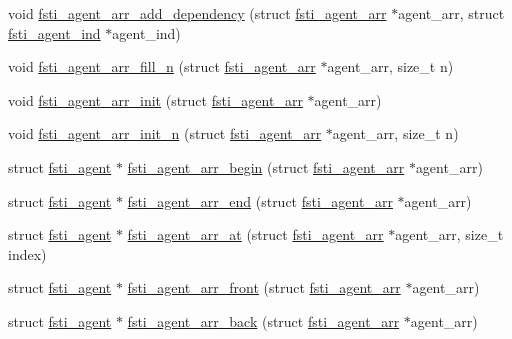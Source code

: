 \begin{DoxyCompactItemize}
void \mbox{\hyperlink{fsti-agent_8h_a63a22afc13737a55174adb97f2cbcfc1}{fsti\+\_\+agent\+\_\+arr\+\_\+add\+\_\+dependency}} (struct \mbox{\hyperlink{structfsti__agent__arr}{fsti\+\_\+agent\+\_\+arr}} $\ast$agent\+\_\+arr, struct \mbox{\hyperlink{structfsti__agent__ind}{fsti\+\_\+agent\+\_\+ind}} $\ast$agent\+\_\+ind)
\item 
void \mbox{\hyperlink{fsti-agent_8h_a87de33f5c064440c162d0c8d0f9ccbf8}{fsti\+\_\+agent\+\_\+arr\+\_\+fill\+\_\+n}} (struct \mbox{\hyperlink{structfsti__agent__arr}{fsti\+\_\+agent\+\_\+arr}} $\ast$agent\+\_\+arr, size\+\_\+t n)
\item 
void \mbox{\hyperlink{fsti-agent_8h_ab657b71989567b40adc4ccea49292540}{fsti\+\_\+agent\+\_\+arr\+\_\+init}} (struct \mbox{\hyperlink{structfsti__agent__arr}{fsti\+\_\+agent\+\_\+arr}} $\ast$agent\+\_\+arr)
\item 
void \mbox{\hyperlink{fsti-agent_8h_a2dc08a5f50e57b979f50f6efb927d57c}{fsti\+\_\+agent\+\_\+arr\+\_\+init\+\_\+n}} (struct \mbox{\hyperlink{structfsti__agent__arr}{fsti\+\_\+agent\+\_\+arr}} $\ast$agent\+\_\+arr, size\+\_\+t n)
\item 
struct \mbox{\hyperlink{structfsti__agent}{fsti\+\_\+agent}} $\ast$ \mbox{\hyperlink{fsti-agent_8h_a30c755dbd7cd8e98b76ebe65b8dc54a2}{fsti\+\_\+agent\+\_\+arr\+\_\+begin}} (struct \mbox{\hyperlink{structfsti__agent__arr}{fsti\+\_\+agent\+\_\+arr}} $\ast$agent\+\_\+arr)
\item 
struct \mbox{\hyperlink{structfsti__agent}{fsti\+\_\+agent}} $\ast$ \mbox{\hyperlink{fsti-agent_8h_a1a5fc4621ece587a603b9b970bc3bd7c}{fsti\+\_\+agent\+\_\+arr\+\_\+end}} (struct \mbox{\hyperlink{structfsti__agent__arr}{fsti\+\_\+agent\+\_\+arr}} $\ast$agent\+\_\+arr)
\item 
struct \mbox{\hyperlink{structfsti__agent}{fsti\+\_\+agent}} $\ast$ \mbox{\hyperlink{fsti-agent_8h_a9f01e2df0acb48b1e9cef63d4314c209}{fsti\+\_\+agent\+\_\+arr\+\_\+at}} (struct \mbox{\hyperlink{structfsti__agent__arr}{fsti\+\_\+agent\+\_\+arr}} $\ast$agent\+\_\+arr, size\+\_\+t index)
\item 
struct \mbox{\hyperlink{structfsti__agent}{fsti\+\_\+agent}} $\ast$ \mbox{\hyperlink{fsti-agent_8h_aaad30933ebf477fc44ee2f7123d335b6}{fsti\+\_\+agent\+\_\+arr\+\_\+front}} (struct \mbox{\hyperlink{structfsti__agent__arr}{fsti\+\_\+agent\+\_\+arr}} $\ast$agent\+\_\+arr)
\item 
struct \mbox{\hyperlink{structfsti__agent}{fsti\+\_\+agent}} $\ast$ \mbox{\hyperlink{fsti-agent_8h_a88eb4bd7a7df9dcbc5b57d3e3e22f9c6}{fsti\+\_\+agent\+\_\+arr\+\_\+back}} (struct \mbox{\hyperlink{structfsti__agent__arr}{fsti\+\_\+agent\+\_\+arr}} $\ast$agent\+\_\+arr)

\end{DoxyCompactItemize}
